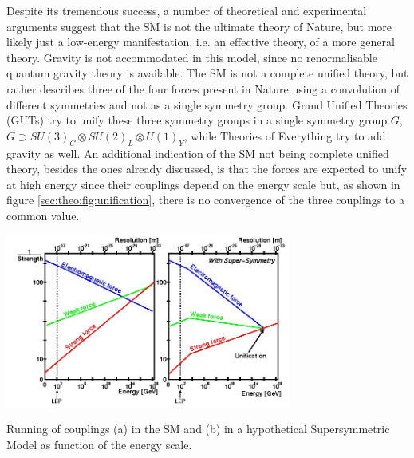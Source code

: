 Despite its tremendous success, a number of theoretical and experimental arguments suggest that the SM is not the ultimate theory of Nature, but more likely just a low-energy manifestation, i.e. an effective theory, of a more general theory.
Gravity is not accommodated in this model, since no renormalisable quantum gravity theory is available. The SM is not a complete unified theory, but rather describes three of the four forces present in Nature using a convolution of different symmetries and not as a single symmetry group. Grand Unified Theories (GUTs) try to unify these three symmetry groups in a single symmetry group $G$, $G\supset SU(3)_{C} \otimes SU(2)_{L} \otimes U(1)_{Y}$, while Theories of Everything try to add gravity as well.
An additional indication of the SM not being complete unified theory, besides the ones already discussed, is that the forces are expected to unify at high energy since their couplings depend on the energy scale but, as shown in figure \ref{sec:theo:fig:unification}, there is no convergence of the three couplings to a common value.

\bfig[t!]
\centering
\includegraphics[width=0.7\textwidth]{figures/Theory/unification.jpg}
\captionsetup{width=0.85\textwidth} \caption{\small Running of couplings (a) in the SM and (b) in a hypothetical Supersymmetric Model as function of the energy scale.}
\label{sec:theo:fig:unification}
\efig


